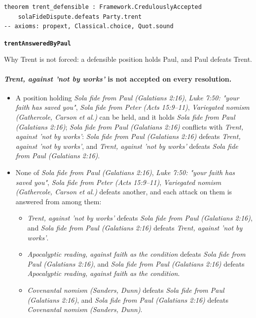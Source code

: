\documentclass[11pt]{article}
\begin{document}
{\small\begin{verbatim}
theorem trent_defensible : Framework.CredulouslyAccepted
    solaFideDispute.defeats Party.trent
-- axioms: propext, Classical.choice, Quot.sound
\end{verbatim}}
\par\medskip\noindent\textbf{\texttt{trent\allowbreak{}Answered\allowbreak{}By\allowbreak{}Paul}}\par\nobreak\noindent
Why Trent is not forced: a defensible position holds Paul, and Paul defeats Trent.

\paragraph{\emph{Trent, against 'not by works'} is not accepted on every resolution.}
\begin{itemize}
\item A position holding \emph{Sola fide from Paul (Galatians 2:16)}, \emph{Luke 7:50: "your faith has saved you"}, \emph{Sola fide from Peter (Acts 15:9–11)}, \emph{Variegated nomism (Gathercole, Carson et al.)} can be held, and it holds \emph{Sola fide from Paul (Galatians 2:16)}; \emph{Sola fide from Paul (Galatians 2:16)} conflicts with \emph{Trent, against 'not by works'}: \emph{Sola fide from Paul (Galatians 2:16)} defeats \emph{Trent, against 'not by works'}, and \emph{Trent, against 'not by works'} defeats \emph{Sola fide from Paul (Galatians 2:16)}.
\item None of \emph{Sola fide from Paul (Galatians 2:16)}, \emph{Luke 7:50: "your faith has saved you"}, \emph{Sola fide from Peter (Acts 15:9–11)}, \emph{Variegated nomism (Gathercole, Carson et al.)} defeats another, and each attack on them is answered from among them:
\begin{itemize}
\item \emph{Trent, against 'not by works'} defeats \emph{Sola fide from Paul (Galatians 2:16)}, and \emph{Sola fide from Paul (Galatians 2:16)} defeats \emph{Trent, against 'not by works'}.
\item \emph{Apocalyptic reading, against faith as the condition} defeats \emph{Sola fide from Paul (Galatians 2:16)}, and \emph{Sola fide from Paul (Galatians 2:16)} defeats \emph{Apocalyptic reading, against faith as the condition}.
\item \emph{Covenantal nomism (Sanders, Dunn)} defeats \emph{Sola fide from Paul (Galatians 2:16)}, and \emph{Sola fide from Paul (Galatians 2:16)} defeats \emph{Covenantal nomism (Sanders, Dunn)}.

\end{itemize}
\end{itemize}
\end{document}
